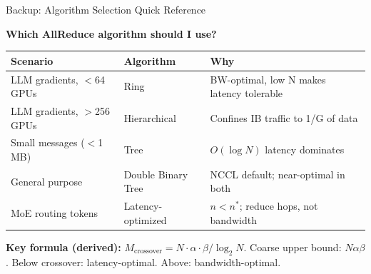 \documentclass[aspectratio=169, 12pt]{beamer}
\begin{document}
\appendix

\begin{frame}{Backup: Algorithm Selection Quick Reference}
\note{
[2 min]
}

\scriptsize
\textbf{Which AllReduce algorithm should I use?}

\vspace{0.1cm}
\renewcommand{\arraystretch}{1.05}
\begin{tabular}{@{}p{3.2cm}lp{4.5cm}@{}}
  \toprule
  \textbf{Scenario} & \textbf{Algorithm} & \textbf{Why} \\
  \midrule
  LLM gradients, $<$64 GPUs    & Ring             & BW-optimal, low N makes latency tolerable \\
  LLM gradients, $>$256 GPUs   & Hierarchical     & Confines IB traffic to 1/G of data \\
  Small messages ($<$1 MB)      & Tree             & $O(\log N)$ latency dominates \\
  General purpose               & Double Binary Tree & NCCL default; near-optimal in both \\
  MoE routing tokens            & Latency-optimized & $n < n^*$; reduce hops, not bandwidth \\
  \bottomrule
\end{tabular}

\vspace{0.08cm}
{\scriptsize\textbf{Key formula (derived):} $M_{\text{crossover}} = N \cdot \alpha \cdot \beta / \log_2 N$. Coarse upper bound: $N\alpha\beta$. Below crossover: latency-optimal. Above: bandwidth-optimal.}

\end{frame}
\end{document}
